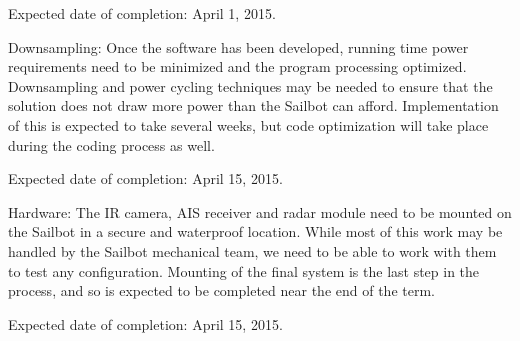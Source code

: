 Expected date of completion: April 1, 2015.\newline


Downsampling:
Once the software has been developed, running time power requirements need to be minimized and the program processing optimized. Downsampling and power cycling techniques may be needed to ensure that the solution does not draw more power than the Sailbot can afford. Implementation of this is expected to take several weeks, but code optimization will take place during the coding process as well.

Expected date of completion: April 15, 2015.\newline


Hardware:
The IR camera, AIS receiver and radar module need to be mounted on the Sailbot in a secure and waterproof location. While most of this work may be handled by the Sailbot mechanical team, we need to be able to work with them to test any configuration. Mounting of the final system is the last step in the process, and so is expected to be completed near the end of the term.

Expected date of completion: April 15, 2015.\newline

